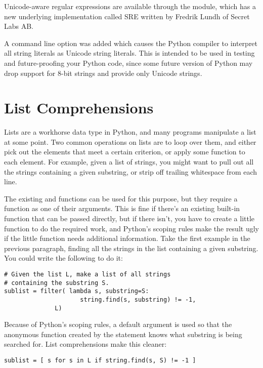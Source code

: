 \documentclass{howto}
\begin{document}
Unicode-aware regular expressions are available through the
 module, which has a new underlying implementation called
SRE written by Fredrik Lundh of Secret Labs AB. 

A  command line option was added which causes the Python
compiler to interpret all string literals as Unicode string literals.
This is intended to be used in testing and future-proofing your Python
code, since some future version of Python may drop support for 8-bit
strings and provide only Unicode strings.

\section{List Comprehensions}

Lists are a workhorse data type in Python, and many programs
manipulate a list at some point.  Two common operations on lists are
to loop over them, and either pick out the elements that meet a
certain criterion, or apply some function to each element.  For
example, given a list of strings, you might want to pull out all the
strings containing a given substring, or strip off trailing whitespace
from each line.  

The existing  and  functions can be
used for this purpose, but they require a function as one of their
arguments.  This is fine if there's an existing built-in function that
can be passed directly, but if there isn't, you have to create a
little function to do the required work, and Python's scoping rules
make the result ugly if the little function needs additional
information.  Take the first example in the previous paragraph,
finding all the strings in the list containing a given substring.  You
could write the following to do it:

\begin{verbatim}
# Given the list L, make a list of all strings 
# containing the substring S.
sublist = filter( lambda s, substring=S: 
                     string.find(s, substring) != -1,
	          L)
\end{verbatim}

Because of Python's scoping rules, a default argument is used so that
the anonymous function created by the  statement knows
what substring is being searched for.  List comprehensions make this
cleaner:

\begin{verbatim}
sublist = [ s for s in L if string.find(s, S) != -1 ]
\end{verbatim}
\end{document}
